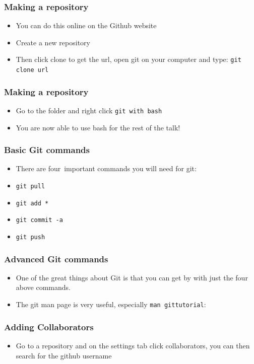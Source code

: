 \documentclass{beamer}
\begin{document}
\begin{frame}
\frametitle{Making a repository}
\begin{itemize}
\item You can do this online on the Github website \footnotemark  
\item Create a new repository
\item Then click clone to get the url, open git on your computer and type: 
	\texttt{git clone url}
\end{itemize}
\end{frame}

\begin{frame}
\frametitle{Making a repository}
\begin{itemize}
	\item Go to the folder and right click \texttt{git with bash}
\item You are now able to use bash for the rest of the talk!
\end{itemize}
\end{frame}

\begin{frame}
\frametitle{Basic Git commands}
\begin{itemize}
	\item There are four\footnotemark\ important commands you will need for git:
	\item \texttt{git pull}
	\item \texttt{git add *}
	\item \texttt{git commit -a}
	\item \texttt{git push}
\end{itemize}
\end{frame}

\begin{frame}
\frametitle{Advanced Git commands}
\begin{itemize}
	\item One of the great things about Git is that you can get by with just the four above commands.
	\item The git man page is very useful, especially \texttt{man gittutorial}:
\end{itemize}
\end{frame}

\begin{frame}
\frametitle{Adding Collaborators}
\begin{itemize}
	\item Go to a repository and on the settings tab click collaborators, you can then search for the github username
\end{itemize}
\end{frame}
\end{document}
